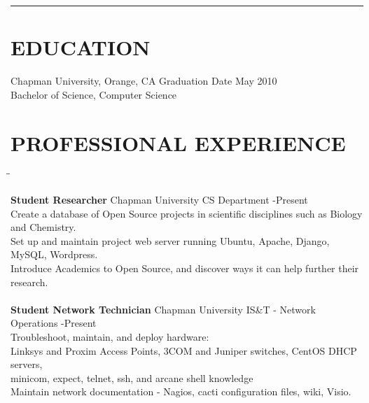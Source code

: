 \documentclass{res}
\begin{document}
 

\address{5205 E. Rolling Hill Drive\\Anaheim, CA 92807}
\address{\hspace{28pt}yasumoto7@gmail.com\\smith237@mail.chapman.edu}

\begin{resume}
\rule{\textwidth}{1pt}

   \vspace{-0.1in}	
\section{EDUCATION}          
	 Chapman University, Orange, CA \hspace{2.9in} Graduation Date May 2010\\
	 Bachelor of Science, Computer Science \\

   \vspace{-0.3in}	
\section{PROFESSIONAL EXPERIENCE}
   \vspace{-5pt}
   \begin{tabbing}
   \hspace{2.5in}\= \hspace{3.45in}\= \kill %

    {\bf Student Researcher} \>\hspace{0.3in}Chapman University CS Department     -Present\\
	 Create a database of Open Source projects in scientific disciplines such as Biology and Chemistry. \\
	 Set up and maintain project web server running Ubuntu, Apache, Django, MySQL, Wordpress.\\
	 Introduce Academics to Open Source, and discover ways it can help further their research.\\

\\

    {\bf Student Network Technician} \>\hspace{0.01}Chapman University IS\&T - Network Operations -Present\\
	 Troubleshoot, maintain, and deploy hardware: \\
	 \hspace{0.3in}Linksys and Proxim Access Points, 3COM and Juniper switches, CentOS DHCP servers,\\
	 \hspace{0.3in}minicom, expect, telnet, ssh, and arcane shell knowledge\\
	 Maintain network documentation - Nagios, cacti configuration files, wiki, Visio.\\


\end{tabbing}
\end{resume}
\end{document}
